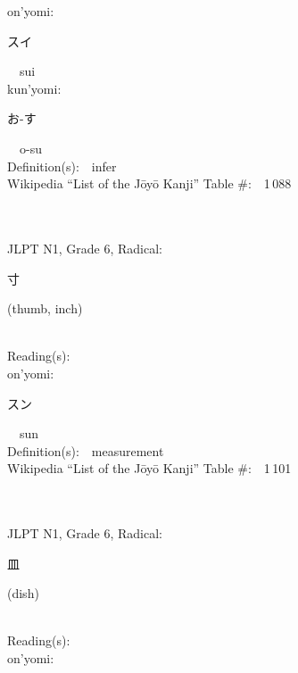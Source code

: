\begin{multicols}{2}
{\hspace*{1em}}on'yomi:\ \ \\
{\hspace*{2em}}{\begin{CJK}{UTF8}{min} スイ \end{CJK}}\ \ sui\ \ \\
{\hspace*{1em}}kun'yomi:\ \ \\
{\hspace*{2em}}{\begin{CJK}{UTF8}{min} お-す \end{CJK}}\ \ o-su\ \ \\
Definition(s):\ \ infer \\
Wikipedia ``List of the J\=oy\=o Kanji'' Table \#:\ \ 1\,088 \\
\ \ \\
{\fontsize{34pt}{40pt}  }\ \ \\  %
{JLPT N1, Grade 6, Radical:\ \ {\begin{CJK}{UTF8}{min} 寸 \end{CJK}} (thumb, inch) } \\
Reading(s):\ \ \\
{\hspace*{1em}}on'yomi:\ \ \\
{\hspace*{2em}}{\begin{CJK}{UTF8}{min} スン \end{CJK}}\ \ sun\ \ \\
Definition(s):\ \ measurement \\
Wikipedia ``List of the J\=oy\=o Kanji'' Table \#:\ \ 1\,101 \\
\ \ \\
{\fontsize{34pt}{40pt}  }\ \ \\  %
{JLPT N1, Grade 6, Radical:\ \ {\begin{CJK}{UTF8}{min} 皿 \end{CJK}} (dish) } \\
Reading(s):\ \ \\
{\hspace*{1em}}on'yomi:\ \ \\

\end{multicols}
